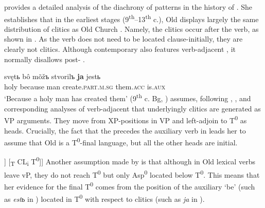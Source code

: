 \documentclass[output=paper,modfonts,newtxmath,hidelinks]{langscibook}
\begin{document}
\citet{pancheva2005} provides a detailed analysis of the diachrony of  patterns in the history of . She establishes that in the earliest stages (9\textsuperscript{th}{}--13\textsuperscript{th} c.), Old  displays largely the same distribution of clitics as Old Church . Namely, the clitics occur after the verb, as shown in . As the verb does not need to be located clause-initially, they are clearly not  clitics. Although contemporary  also features verb-adjacent , it normally disallows post- .





\ea \label{11:ex2}
\gll svętь bô mõžъ stvorilъ \textbf{ja} jestь \\
     holy because man create.\textsc{part.m.sg} them.\textsc{acc} is.\textsc{aux}\\
\glt `Because a holy man has created them' \hfill (9\textsuperscript{th} c. Bg, \citealt[139]{pancheva2005})
\z
\citeauthor{pancheva2005} assumes, following \citet{kayne1991}, \citet{Chomsky1995}, and corresponding analyses of verb-adjacent  that underlyingly  clitics are generated as VP arguments. They move from XP-positions in VP and left-adjoin to T\textsuperscript{0} as heads. Crucially, the fact that the    precedes the auxiliary verb in  leads her to assume that Old  is a T\textsuperscript{0}{}-final language, but all the other heads are initial.

\ea \label{11:ex3}
\glt [\textsubscript{TP} [\textsubscript{vP} [\textsubscript{V’} t\textsubscript{i} V\textsuperscript{0} ]] [\textsubscript{T} CL\textsubscript{i} T\textsuperscript{0}]]  \hfill \citep[139]{pancheva2005}
\z
Another assumption made by \citet[146]{pancheva2005} is that although in Old  lexical verbs leave vP, they do not reach T\textsuperscript{0} but only Asp\textsuperscript{0} located below T\textsuperscript{0}. This means that her evidence for the final T\textsuperscript{0} comes from the position of the auxiliary `be' (such as \textit{estь} in ) located in T\textsuperscript{0} with respect to  clitics (such as \textit{ja} in ).
\end{document}
